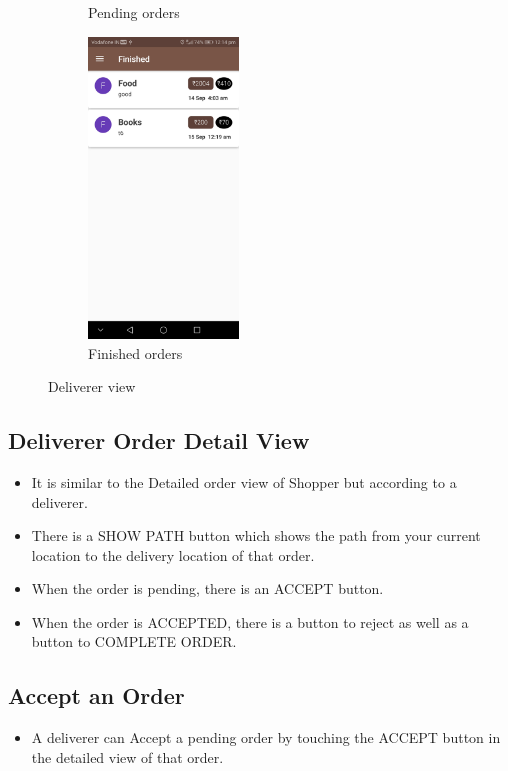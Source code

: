 \documentclass{report}
\begin{document}
\begin{figure}[h!]
\begin{subfigure}[h!]{.24\textwidth}
\caption{\centering Pending orders}
\end{subfigure}
\begin{subfigure}[h!]{.24\textwidth}
\centering
\includegraphics[width=4cm]{finished_deliverer.jpg}
\caption{\centering Finished orders}
\end{subfigure}
\caption{ Deliverer view} 
\label{fig:NASA_Logo}
\end{figure}


\subsection{Deliverer Order Detail View}
\begin{itemize}
\item It is similar to the Detailed order view of Shopper but according to a deliverer.
\item There is a SHOW PATH button which shows the path from your current location to the delivery location of that order.
\item When the order is pending, there is an ACCEPT button.
\item When the order is ACCEPTED, there is a button to reject as well as a button to COMPLETE ORDER.
\end{itemize}

\subsection{Accept an Order}
\begin{itemize}
\item A deliverer can Accept a pending order by touching the ACCEPT button in the detailed view of that order.
\end{itemize}
\end{document}
